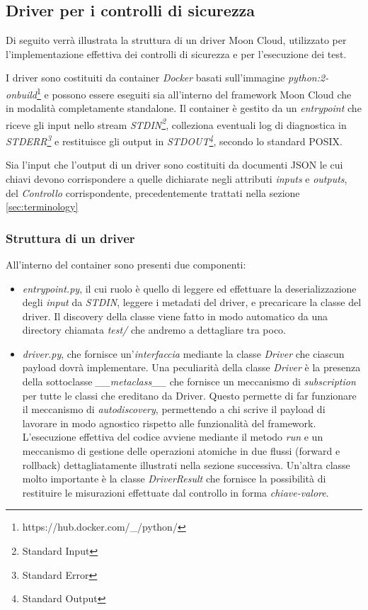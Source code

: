 \documentclass[../main.tex]{subfiles}
\begin{document}
\subsection{Driver per i controlli di sicurezza}
Di seguito verrà illustrata la struttura di un driver Moon Cloud, utilizzato per l'implementazione effettiva dei controlli di sicurezza e per l'esecuzione dei test.

I driver sono costituiti da container \textit{Docker} basati sull'immagine \textit{python:2-onbuild}\footnote{https://hub.docker.com/\_/python/} e possono essere eseguiti sia all'interno del framework Moon Cloud che in modalità completamente standalone.
Il container è gestito da un \textit{entrypoint} che riceve gli input nello stream \textit{STDIN\footnote{Standard Input}}, colleziona eventuali log di diagnostica in \textit{STDERR\footnote{Standard Error}} e restituisce gli output in \textit{STDOUT\footnote{Standard Output}}, secondo lo standard POSIX.

Sia l'input che l'output di un driver sono costituiti da documenti JSON le cui chiavi devono corrispondere a quelle dichiarate negli attributi \textit{inputs} e \textit{outputs}, del \textit{Controllo} corrispondente, precedentemente trattati nella sezione \ref{sec:terminology}
\subsubsection{Struttura di un driver}
\label{subsec:strutturadriver}
All'interno del container sono presenti due componenti:
\begin{itemize}
    \item{\textit{entrypoint.py}}, il cui ruolo è quello di leggere ed effettuare la deserializzazione degli \textit{input} da \textit{STDIN}, leggere i metadati del driver, e precaricare la classe del driver.
        Il discovery della classe viene fatto in modo automatico da una directory chiamata \textit{test/} che andremo a dettagliare tra poco.
    \item{\textit{driver.py}}, che fornisce un'\textit{interfaccia} mediante la classe \textit{Driver} che ciascun payload dovrà implementare.
        Una peculiarità della classe \textit{Driver} è la presenza della sottoclasse \textit{\_\_metaclass\_\_} che fornisce un meccanismo di \textit{subscription} per tutte le classi che ereditano da Driver. Questo permette di far funzionare il meccanismo di \textit{autodiscovery}, permettendo a chi scrive il payload di lavorare in modo agnostico rispetto alle funzionalità del framework.
        L'esecuzione effettiva del codice avviene mediante il metodo \textit{run} e un meccanismo di gestione delle operazioni atomiche in due flussi (forward e rollback) dettagliatamente illustrati nella sezione successiva.
        Un'altra classe molto importante è la classe \textit{DriverResult} che fornisce la possibilità di restituire le misurazioni effettuate dal controllo in forma \textit{chiave-valore}.
\end{itemize}
\end{document}
